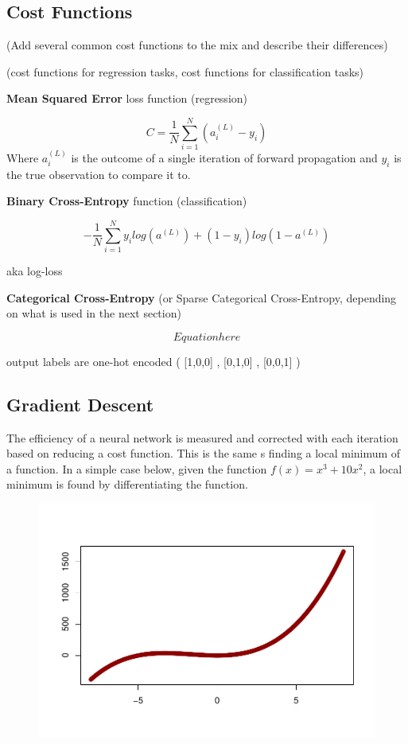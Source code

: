 \hypertarget{cost-functions}{%
\subsection{Cost Functions}\label{cost-functions}}

(Add several common cost functions to the mix and describe their differences)

(cost functions for regression tasks, cost functions for classification tasks)

\textbf{Mean Squared Error} loss function (regression)

\[
C = \frac{1}{N} \sum_{i=1}^N (a^{(L)}_i - y_i)
\] Where \(a^{(L)}_i\) is the outcome of a single iteration of forward
propagation and \(y_i\) is the true observation to compare it to.

\textbf{Binary Cross-Entropy} function (classification)

$$
- \frac{1}{N} \sum_{i=1}^N y_i log (a^{(L)}) + (1-y_i) log(1-a^{(L)})
$$

aka log-loss

\textbf{Categorical Cross-Entropy} (or Sparse Categorical Cross-Entropy, depending on what is used in the next section)

$$
Equation here
$$

output labels are one-hot encoded  (
[1,0,0] , [0,1,0] , [0,0,1] )


\hypertarget{gradient-descent}{%
\subsection{Gradient Descent}\label{gradient-descent}}

The efficiency of a neural network is measured and corrected with each
iteration based on reducing a cost function. This is the same s finding
a local minimum of a function. In a simple case below, given the
function \(f(x) = x^3 + 10x^2\), a local minimum is found by
differentiating the function.

\begin{figure}[H]
    \centering
    \includegraphics[width = .7\textwidth]{Figures/grad_desc_2D-1.pdf}
\end{figure}

